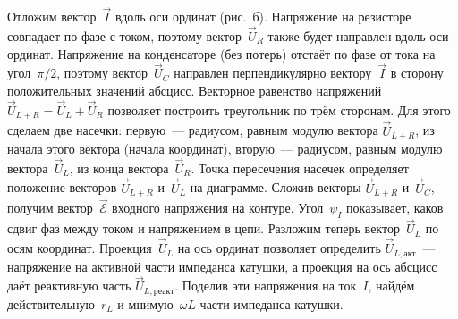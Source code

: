 Отложим вектор~$\vec I$ вдоль оси ординат (рис.~б). Напряжение на
резисторе совпадает по фазе с током, поэтому вектор~$\vec U_R$ также будет
направлен вдоль оси ординат. Напряжение на конденсаторе (без потерь) отстаёт по
фазе от тока на угол~$\pi/2$, поэтому вектор~$\vec U_C$ направлен
перпендикулярно вектору~$\vec I$ в сторону положительных значений абсцисс.
Векторное равенство напряжений $\vec U_{L+R}=\vec U_L+\vec U_R$ позволяет
построить треугольник по трём сторонам. Для этого сделаем две насечки:
первую~--- радиусом, равным модулю вектора $\vec U_{L+R}$, из начала этого
вектора (начала координат), вторую~--- радиусом, равным модулю вектора~$\vec
U_L$, из конца вектора~$\vec U_R$. Точка пересечения насечек определяет
положение векторов $\vec U_{L+R}$ и~$\vec U_L$ на диаграмме. Сложив векторы
$\vec{U}_{L+R}$ и~$\vec U_C$, получим вектор~$\vec{\mathcal{E}}$ входного
напряжения на контуре. Угол~$\psi_I$ показывает, каков сдвиг фаз между током и
напряжением в цепи. Разложим теперь вектор~$\vec U_L$ по осям координат.
Проекция~$\vec U_L$ на ось ординат позволяет определить $\vec
U_{L,\text{акт}}$~--- напряжение на активной части импеданса катушки, а проекция
на ось абсцисс даёт реактивную часть $\vec U_{L,\text{реакт}}$. Поделив эти
напряжения на ток~$I$, найдём действительную~$r_L$ и мнимую~$\omega L$ части
импеданса катушки.

